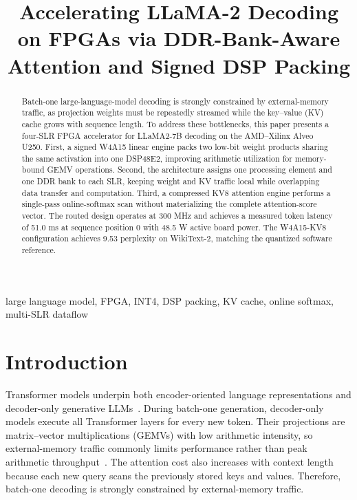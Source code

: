 \documentclass[conference]{IEEEtran}
\begin{document}
\title{Accelerating LLaMA-2 Decoding on FPGAs via DDR-Bank-Aware Attention and Signed DSP Packing}

\author{}

\maketitle

\begin{abstract}
Batch-one large-language-model decoding is strongly constrained by external-memory traffic, as projection weights must be repeatedly streamed while the key–value (KV) cache grows with sequence length. To address these bottlenecks, this paper presents a four-SLR FPGA accelerator for LLaMA2-7B decoding on the AMD–Xilinx Alveo U250. First, a signed W4A15 linear engine packs two low-bit weight products sharing the same activation into one DSP48E2, improving arithmetic utilization for memory-bound GEMV operations. Second, the architecture assigns one processing element and one DDR bank to each SLR, keeping weight and KV traffic local while overlapping data transfer and computation. Third, a compressed KV8 attention engine performs a single-pass online-softmax scan without materializing the complete attention-score vector. The routed design operates at 300 MHz and achieves a measured token latency of 51.0 ms at sequence position 0 with 48.5 W active board power. The W4A15-KV8 configuration achieves 9.53 perplexity on WikiText-2, matching the quantized software reference.

\end{abstract}

\begin{IEEEkeywords}
large language model, FPGA, INT4, DSP packing, KV cache, online softmax,
multi-SLR dataflow
\end{IEEEkeywords}

\section{Introduction}

Transformer models underpin both encoder-oriented language representations and
decoder-only generative LLMs~\cite{transformer,bert,llama2}. During batch-one
generation, decoder-only models execute all Transformer layers for every new
token. Their projections are matrix--vector multiplications (GEMVs) with low
arithmetic intensity, so external-memory traffic commonly limits performance
rather than peak arithmetic throughput~\cite{llama2,inference-roofline}. The
attention cost also increases with context length because each new query scans
the previously stored keys and values. Therefore, batch-one decoding is
strongly constrained by external-memory traffic.
\end{document}
